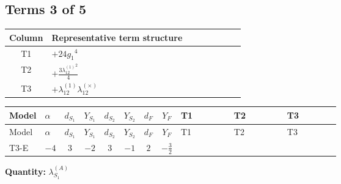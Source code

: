 \documentclass[8pt]{article}
\begin{document}
\begin{landscape}
\subsection*{Terms 3 of 5}
\begin{center}
\begin{tabular}{@{}c >{\raggedright\arraybackslash}p{0.82\linewidth}@{}}
\toprule
Column & Representative term structure \\
\midrule
T1 & \(\displaystyle +24 {g_1}^4\) \\
\midrule
T2 & \(\displaystyle +\frac{3 {\lambda_{12}^{(1)}}^2}{4}\) \\
\midrule
T3 & \(\displaystyle +{\lambda_{12}^{(1)}} {\lambda_{12}^{(\times)}}\) \\
\midrule
\bottomrule
\end{tabular}
\end{center}
\smallskip
\tiny
\begin{longtable}{@{}llcccccc >{\raggedright\arraybackslash}p{0.21\linewidth} >{\raggedright\arraybackslash}p{0.21\linewidth} >{\raggedright\arraybackslash}p{0.21\linewidth}@{}}
\toprule
Model & $\alpha$ & $d_{S_1}$ & $Y_{S_1}$ & $d_{S_2}$ & $Y_{S_2}$ & $d_F$ & $Y_F$ & T1 & T2 & T3 \\
\midrule
\endfirsthead
\toprule
Model & $\alpha$ & $d_{S_1}$ & $Y_{S_1}$ & $d_{S_2}$ & $Y_{S_2}$ & $d_F$ & $Y_F$ & T1 & T2 & T3 \\
\midrule
\endhead
T3-E & $-4$ & $3$ & $-2$ & $3$ & $-1$ & $2$ & $-\frac{3}{2}$ & \scriptsize\adjustbox{max width=\linewidth}{$\begin{gathered} +24 {g_1}^4\end{gathered}$} & \scriptsize\adjustbox{max width=\linewidth}{$\begin{gathered} +\frac{3 {\lambda_{12}^{(1)}}^2}{4}\end{gathered}$} & \scriptsize\adjustbox{max width=\linewidth}{$\begin{gathered} +{\lambda_{12}^{(1)}} {\lambda_{12}^{(\times)}}\end{gathered}$} \\
\midrule
\bottomrule
\end{longtable}
\clearpage
\noindent\textbf{Quantity: }$\lambda_{S_1}^{(A)}$\par\smallskip

\end{landscape}
\end{document}
